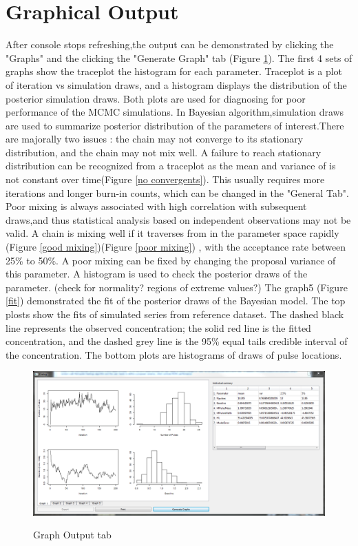 \documentclass[11pt]{book}
\begin{document}
\section{Graphical Output}
After console stops refreshing,the output can be demonstrated by clicking the "Graphs"  and the clicking the "Generate Graph" tab  (Figure \ref{graph}). The first 4 sets of graphs show the traceplot the histogram for each parameter. Traceplot is a plot of iteration vs simulation draws, and a histogram displays the distribution of the posterior simulation draws. Both plots are used for diagnosing for poor performance of the MCMC simulations. In  Bayesian algorithm,simulation draws are used to summarize posterior distribution of the parameters of interest.There are majorally two issues : the chain may not converge to its stationary distribution, and the chain may not mix well. A failure to reach stationary distribution can be recognized from a traceplot as the mean and variance of is not constant over time(Figure \ref{no convergents}). This usually requires more iterations and longer burn-in counts, which can be changed in the "General Tab". Poor mixing is always associated with high correlation with subsequent draws,and thus statistical analysis based on independent observations may not be valid. A chain is mixing well if it traverses from in the parameter space rapidly (Figure \ref{good mixing})(Figure \ref{poor mixing}) , with the acceptance rate between 25\% to 50\%. A poor mixing can be fixed by changing the proposal variance of this parameter. A histogram is used to check the posterior draws of the parameter. (check for normality? regions of extreme values?)
The graph5 (Figure \ref{fit}) demonstrated the fit of the posterior draws of the Bayesian model. The top plosts show the fits of simulated series from reference dataset. The dashed black line represents the observed concentration; the solid red line is the fitted concentration, and the dashed grey line is the 95\% equal tails credible interval of the concentration. The bottom plots are histograms of draws of pulse locations. 
\begin{figure}
  \centering
  \includegraphics[width=\textwidth]{grapho.PNG}\\
  \caption{Graph Output tab}\label{graph}
\end{figure}
\end{document}
